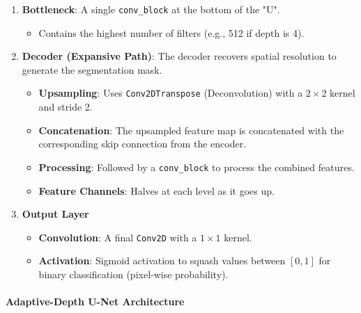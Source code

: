 \begin{enumerate}
    \item \textbf{Bottleneck}: A single \texttt{conv\_block} at the bottom of the "U".
    \begin{itemize}
        \item Contains the highest number of filters (e.g., 512 if depth is 4).
    \end{itemize}

    \item \textbf{Decoder (Expansive Path)}: The decoder recovers spatial resolution to generate the segmentation mask.
    \begin{itemize}
        \item \textbf{Upsampling}: Uses \texttt{Conv2DTranspose} (Deconvolution) with a $2 \times 2$ kernel and stride 2.
        \item \textbf{Concatenation}: The upsampled feature map is concatenated with the corresponding skip connection from the encoder.
        \item \textbf{Processing}: Followed by a \texttt{conv\_block} to process the combined features.
        \item \textbf{Feature Channels}: Halves at each level as it goes up.
    \end{itemize}

    \item \textbf{Output Layer}
    \begin{itemize}
        \item \textbf{Convolution}: A final \texttt{Conv2D} with a $1 \times 1$ kernel.
        \item \textbf{Activation}: Sigmoid activation to squash values between $[0, 1]$ for binary classification (pixel-wise probability).
    \end{itemize}
\end{enumerate}


\paragraph{Adaptive-Depth U-Net Architecture}


